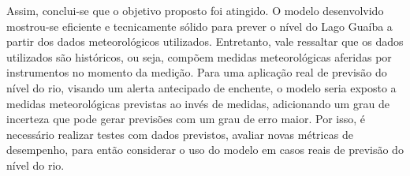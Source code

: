 Assim, conclui-se que o objetivo proposto foi atingido. O modelo desenvolvido mostrou-se eficiente e tecnicamente sólido para prever o nível do Lago Guaíba a partir dos dados meteorológicos utilizados. Entretanto, vale ressaltar que os dados utilizados são históricos, ou seja, compõem medidas meteorológicas aferidas por instrumentos no momento da medição. Para uma aplicação real de previsão do nível do rio, visando um alerta antecipado de enchente, o modelo seria exposto a medidas meteorológicas previstas ao invés de medidas, adicionando um grau de incerteza que pode gerar previsões com um grau de erro maior. Por isso, é necessário realizar testes com dados previstos, avaliar novas métricas de desempenho, para então considerar o uso do modelo em casos reais de previsão do nível do rio.  